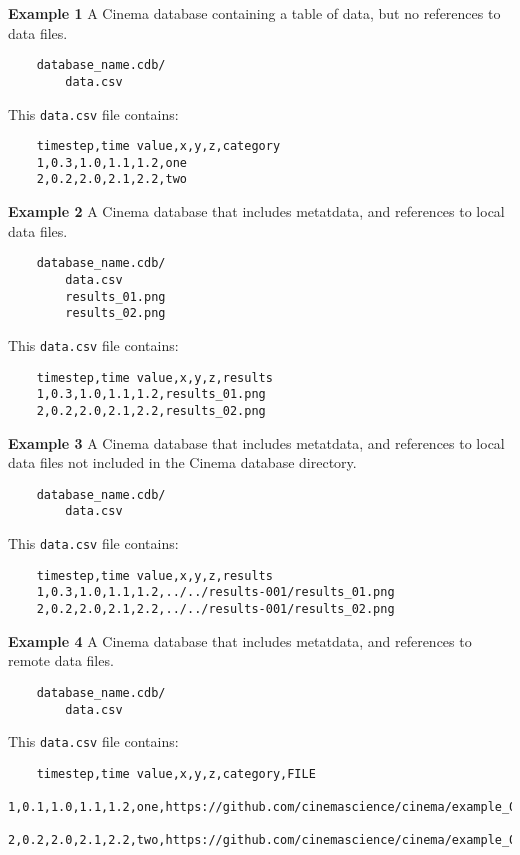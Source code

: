 \noindent
\textbf{Example 1} A Cinema database containing a table of data, but no references to data files.

\begin{verbatim}
    database_name.cdb/
        data.csv
\end{verbatim}

This \texttt{\small data.csv} file contains:

\begin{verbatim}
    timestep,time value,x,y,z,category
    1,0.3,1.0,1.1,1.2,one
    2,0.2,2.0,2.1,2.2,two
\end{verbatim}

\noindent
\textbf{Example 2} A Cinema database that includes metatdata, and references to local data files.

\begin{verbatim}
    database_name.cdb/
        data.csv
        results_01.png
        results_02.png
\end{verbatim}

This \texttt{\small data.csv} file contains:

\begin{verbatim}
    timestep,time value,x,y,z,results
    1,0.3,1.0,1.1,1.2,results_01.png
    2,0.2,2.0,2.1,2.2,results_02.png
\end{verbatim}

\noindent
\textbf{Example 3} A Cinema database that includes metatdata, and references to local data files not included in the Cinema database directory.

\begin{verbatim}
    database_name.cdb/
        data.csv
\end{verbatim}

This \texttt{\small data.csv} file contains:

\begin{verbatim}
    timestep,time value,x,y,z,results
    1,0.3,1.0,1.1,1.2,../../results-001/results_01.png
    2,0.2,2.0,2.1,2.2,../../results-001/results_02.png
\end{verbatim}

\noindent
\textbf{Example 4} A Cinema database that includes metatdata, and references to remote data files.

\begin{verbatim}
    database_name.cdb/
        data.csv
\end{verbatim}

This \texttt{\small data.csv} file contains:

\begin{verbatim}
    timestep,time value,x,y,z,category,FILE
    1,0.1,1.0,1.1,1.2,one,https://github.com/cinemascience/cinema/example_01.vti
    2,0.2,2.0,2.1,2.2,two,https://github.com/cinemascience/cinema/example_02.vti
\end{verbatim}

